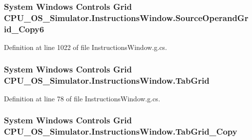 \subsubsection[{Source\+Operand\+Grid\+\_\+\+Copy6}]{\setlength{\rightskip}{0pt plus 5cm}System Windows Controls Grid C\+P\+U\+\_\+\+O\+S\+\_\+\+Simulator.\+Instructions\+Window.\+Source\+Operand\+Grid\+\_\+\+Copy6\hspace{0.3cm}{\ttfamily [package]}}\label{class_c_p_u___o_s___simulator_1_1_instructions_window_a3dfdd68ad6b08fb1612fd43a420e5193}


Definition at line 1022 of file Instructions\+Window.\+g.\+cs.

\hypertarget{class_c_p_u___o_s___simulator_1_1_instructions_window_a8e5436d90df63837c7f39586855bda1b}{}
\subsubsection[{Tab\+Grid}]{\setlength{\rightskip}{0pt plus 5cm}System Windows Controls Grid C\+P\+U\+\_\+\+O\+S\+\_\+\+Simulator.\+Instructions\+Window.\+Tab\+Grid\hspace{0.3cm}{\ttfamily [package]}}\label{class_c_p_u___o_s___simulator_1_1_instructions_window_a8e5436d90df63837c7f39586855bda1b}


Definition at line 78 of file Instructions\+Window.\+g.\+cs.

\hypertarget{class_c_p_u___o_s___simulator_1_1_instructions_window_a0f8731825bc5369e0328b2b9580e9b67}{}
\subsubsection[{Tab\+Grid\+\_\+\+Copy}]{\setlength{\rightskip}{0pt plus 5cm}System Windows Controls Grid C\+P\+U\+\_\+\+O\+S\+\_\+\+Simulator.\+Instructions\+Window.\+Tab\+Grid\+\_\+\+Copy\hspace{0.3cm}{\ttfamily [package]}}\label{class_c_p_u___o_s___simulator_1_1_instructions_window_a0f8731825bc5369e0328b2b9580e9b67}


